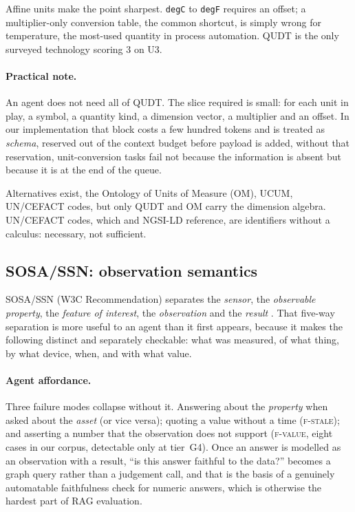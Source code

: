 Affine units make the point sharpest. \texttt{degC} to \texttt{degF} requires an
offset; a multiplier-only conversion table, the common shortcut, is simply
wrong for temperature, the most-used quantity in process automation. QUDT is the
only surveyed technology scoring $3$ on U3.

\paragraph{Practical note.} An agent does not need all of QUDT. The slice
required is small: for each unit in play, a symbol, a quantity kind, a dimension
vector, a multiplier and an offset. In our implementation that block costs a few
hundred tokens and is treated as \emph{schema}, reserved out of the context
budget before payload is added, without that reservation, unit-conversion
tasks fail not because the information is absent but because it is at the end of
the queue.

Alternatives exist, the Ontology of Units of Measure (OM), UCUM, UN/CEFACT
codes, but only QUDT and OM carry the dimension algebra. UN/CEFACT codes, which
\opcua{} and NGSI-LD reference, are identifiers without a calculus: necessary,
not sufficient.

\subsection{SOSA/SSN: observation semantics}

SOSA/SSN (W3C Recommendation) separates the \emph{sensor}, the
\emph{observable property}, the \emph{feature of interest}, the
\emph{observation} and the \emph{result} \cite{haller2019ssn}. That five-way separation is more
useful to an agent than it first appears, because it makes the following
distinct and separately checkable: what was measured, of what thing, by what
device, when, and with what value.

\paragraph{Agent affordance.} Three failure modes collapse without it. Answering
about the \emph{property} when asked about the \emph{asset} (or vice versa);
quoting a value without a time (\textsc{f-stale}); and asserting a number that
the observation does not support (\textsc{f-value}, eight cases in our corpus,
detectable only at tier~G4). Once an answer is modelled as an observation with a
result, ``is this answer faithful to the data?'' becomes a graph query rather
than a judgement call, and that is the basis of a genuinely automatable
faithfulness check for numeric answers, which is otherwise the hardest part of
RAG evaluation.

